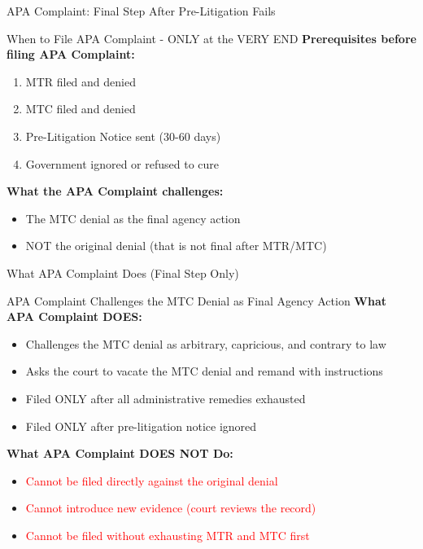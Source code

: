 \documentclass[11pt]{beamer}
\begin{document}
	\begin{frame}{APA Complaint: Final Step After Pre-Litigation Fails}
		\scriptsize
		\begin{block}{When to File APA Complaint - ONLY at the VERY END}
			\textbf{Prerequisites before filing APA Complaint:}
			\begin{enumerate}
				\item MTR filed and denied
				\item MTC filed and denied
				\item Pre-Litigation Notice sent (30-60 days)
				\item Government ignored or refused to cure
			\end{enumerate}
			\textbf{What the APA Complaint challenges:}
			\begin{itemize}
				\item The MTC denial as the final agency action
				\item NOT the original denial (that is not final after MTR/MTC)
			\end{itemize}
		\end{block}
	\end{frame}
	
	\begin{frame}{What APA Complaint Does (Final Step Only)}
		\scriptsize
		\begin{block}{APA Complaint Challenges the MTC Denial as Final Agency Action}
			\textbf{What APA Complaint DOES:}
			\begin{itemize}
				\item Challenges the MTC denial as arbitrary, capricious, and contrary to law
				\item Asks the court to vacate the MTC denial and remand with instructions
				\item Filed ONLY after all administrative remedies exhausted
				\item Filed ONLY after pre-litigation notice ignored
			\end{itemize}
			\textbf{What APA Complaint DOES NOT Do:}
			\begin{itemize}
				\item \textcolor{red}{Cannot be filed directly against the original denial}
				\item \textcolor{red}{Cannot introduce new evidence (court reviews the record)}
				\item \textcolor{red}{Cannot be filed without exhausting MTR and MTC first}
			\end{itemize}
		\end{block}
	\end{frame}
	
\end{document}
